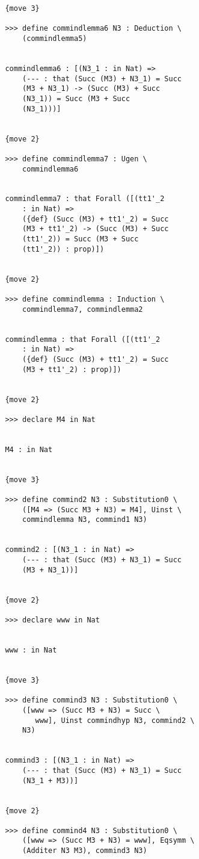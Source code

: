 \documentclass[12pt]{article}
\begin{document}
\begin{verbatim}
         {move 3}

         >>> define commindlemma6 N3 : Deduction \
             (commindlemma5)


         commindlemma6 : [(N3_1 : in Nat) => 
             (--- : that (Succ (M3) + N3_1) = Succ 
             (M3 + N3_1) -> (Succ (M3) + Succ 
             (N3_1)) = Succ (M3 + Succ 
             (N3_1)))]


         {move 2}

         >>> define commindlemma7 : Ugen \
             commindlemma6


         commindlemma7 : that Forall ([(tt1'_2 
             : in Nat) => 
             ({def} (Succ (M3) + tt1'_2) = Succ 
             (M3 + tt1'_2) -> (Succ (M3) + Succ 
             (tt1'_2)) = Succ (M3 + Succ 
             (tt1'_2)) : prop)])


         {move 2}

         >>> define commindlemma : Induction \
             commindlemma7, commindlemma2


         commindlemma : that Forall ([(tt1'_2 
             : in Nat) => 
             ({def} (Succ (M3) + tt1'_2) = Succ 
             (M3 + tt1'_2) : prop)])


         {move 2}

         >>> declare M4 in Nat


         M4 : in Nat


         {move 3}

         >>> define commind2 N3 : Substitution0 \
             ([M4 => (Succ M3 + N3) = M4], Uinst \
             commindlemma N3, commind1 N3)


         commind2 : [(N3_1 : in Nat) => 
             (--- : that (Succ (M3) + N3_1) = Succ 
             (M3 + N3_1))]


         {move 2}

         >>> declare www in Nat


         www : in Nat


         {move 3}

         >>> define commind3 N3 : Substitution0 \
             ([www => (Succ M3 + N3) = Succ \
                www], Uinst commindhyp N3, commind2 \
             N3)


         commind3 : [(N3_1 : in Nat) => 
             (--- : that (Succ (M3) + N3_1) = Succ 
             (N3_1 + M3))]


         {move 2}

         >>> define commind4 N3 : Substitution0 \
             ([www => (Succ M3 + N3) = www], Eqsymm \
             (Additer N3 M3), commind3 N3)



\end{verbatim}
\end{document}
